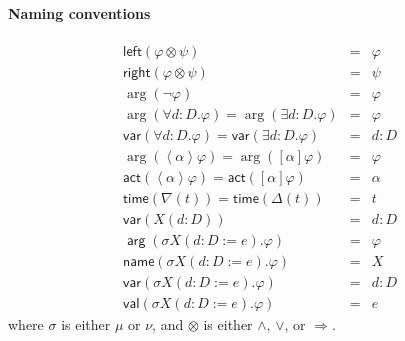 \documentclass{article}
\begin{document}
\paragraph{Naming conventions}

\begin{equation*}
\begin{array}{lcl}
\mathsf{left}(\varphi \otimes \psi ) & = & \varphi \\
\mathsf{right}(\varphi \otimes \psi ) & = & \psi \\
\arg (\lnot \varphi ) & = & \varphi \\
\arg (\forall d:D.\varphi )=\arg (\exists d:D.\varphi ) & = & \varphi \\
\mathsf{var}(\forall d:D.\varphi )=\mathsf{var}(\exists d:D.\varphi ) & = &
d:D \\
\arg (\left\langle \alpha \right\rangle \varphi )=\arg ([\alpha ]\varphi ) &
= & \varphi \\
\mathsf{act}(\left\langle \alpha \right\rangle \varphi )=\mathsf{act}%
([\alpha ]\varphi ) & = & \alpha \\
\mathsf{time}(\nabla (t))=\mathsf{time}(\Delta (t)) & = & t \\
\mathsf{var}(X(d:D)) & = & d:D \\
\mathsf{\arg }(\sigma X(d:D:=e).\varphi ) & = & \varphi \\
\mathsf{name}(\sigma X(d:D:=e).\varphi ) & = & X \\
\mathsf{var}(\sigma X(d:D:=e).\varphi ) & = & d:D \\
\mathsf{val}(\sigma X(d:D:=e).\varphi ) & = & e%
\end{array}%
\end{equation*}%
where $\sigma $ is either $\mu $ or $\nu $, and $\otimes $ is either $\wedge
$, $\vee $, or $\Rightarrow $.
\end{document}
